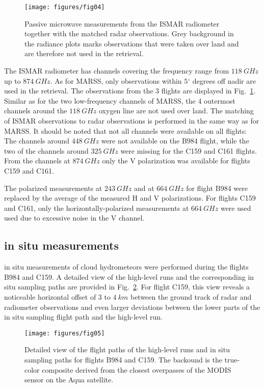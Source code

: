 \documentclass[journal abbreviation, manuscript]{copernicus}
\begin{document}
\begin{figure}[h!]
  \centering
  \texttt{[image: figures/fig04]}
  \caption{
    Passive microwave measurements from the ISMAR radiometer together with the
    matched radar observations. Grey background in the radiance plots marks
    observations that were taken over land and are therefore not used in
    the retrieval.
    }
  \label{fig:observations_ismar}
\end{figure}

The ISMAR radiometer has channels covering the frequency range from
$118\ \unit{GHz}$ up to $874\ \unit{GHz}$. As for MARSS, only observations
within $5\unit{^\circ}$ degrees off nadir are used in the retrieval. The
observations from the 3 flights are displayed in
Fig.~\ref{fig:observations_ismar}. Similar as for the two low-frequency
channels of MARSS, the 4 outermost channels around the $118\ \unit{GHz}$ oxygen
line are not used over land. The matching of ISMAR observations to radar
observations is performed in the same way as for MARSS. It should be noted that
not all channels were available on all flights: The channels around
$448\ \unit{GHz}$ were not available on the B984 flight, while the two of the
channels around $325\ \unit{GHz}$ were missing for the C159 and C161 flights.
From the channels at $874\ \unit{GHz}$ only the V polarization was available
for flights C159 and C161.

The polarized measurements at $243\ \unit{GHz}$ and at $664\ \unit{GHz}$ for
flight B984 were replaced by the average of the measured H and V polarizations.
For flights C159 and C161, only the horizontally-polarized measurements at
$664\ \unit{GHz}$ were used used due to excessive noise in the V channel.

\subsection{in situ measurements}
\label{sec:in_situ}

in situ measurements of cloud hydrometeors were performed during the flights
B984 and C159. A detailed view of the high-level runs and the corresponding
in situ sampling paths are provided in Fig.~\ref{fig:flight_overview_detail}.
For flight C159, this view reveals a noticeable horizontal offset of $3$ to
$4\ \unit{km}$ between the ground track of radar and radiometer observations and
even larger deviations between the lower parts of the in situ sampling flight
path and the high-level run.

\begin{figure}[h!]
  \centering
  \texttt{[image: figures/fig05]}
  \caption{
    Detailed view of the flight paths of the high-level runs and in situ sampling
    paths for flights B984 and C159. The backound is the true-color composite
    derived from the closest overpasses of the MODIS \citep{modis} sensor
    on the Aqua satellite.
    }
  \label{fig:flight_overview_detail}
\end{figure}
\end{document}
